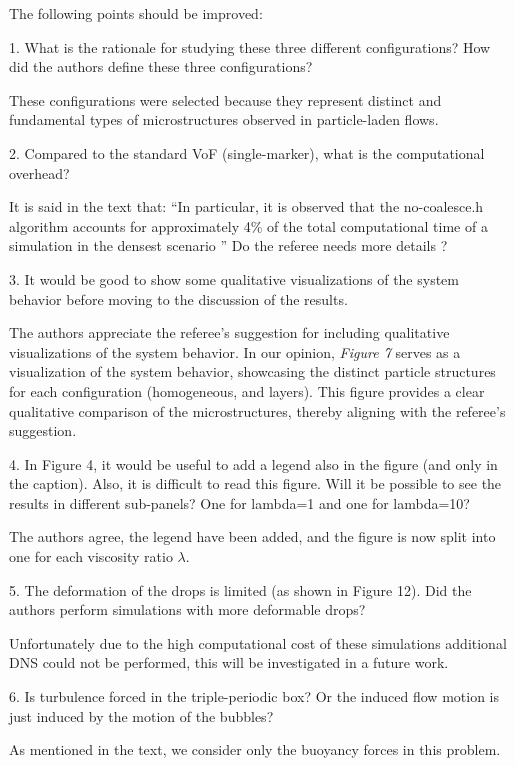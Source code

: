 \documentclass[10pt,a4paper]{article}
\newcommand{\tb}[1]{\color{blue}#1\color{black}}
\begin{document}
The following points should be improved:

1. What is the rationale for studying these three different configurations? How did the authors define these three configurations?

\tb{
    These configurations were selected because they represent distinct and fundamental types of microstructures observed in particle-laden flows. 
}

2. Compared to the standard VoF (single-marker), what is the computational overhead?

\tb{
    It is said in the text that:  
    ``In
    particular, it is observed that the no-coalesce.h algorithm accounts for approximately 4\% of the total
    computational time of a simulation in the densest scenario
    ''
    Do the referee needs more details ? 
}

3. It would be good to show some qualitative visualizations of the system behavior before moving to the discussion of the results.

\tb{
    The authors appreciate the referee's suggestion for including qualitative visualizations of the system behavior. 
    In our opinion, \textit{Figure 7} serves as a visualization of the system behavior, showcasing the distinct particle structures for each configuration (homogeneous, and layers). 
    This figure provides a clear qualitative comparison of the microstructures, thereby aligning with the referee's suggestion.
}

4. In Figure 4, it would be useful to add a legend also in the figure (and only in the caption). Also, it is difficult to read this figure. Will it be possible to see the results in different sub-panels? One for lambda=1 and one for lambda=10?

\tb{
    The authors agree, the legend have been added, and the figure is now split into one for each viscosity ratio $\lambda$. 
}

5. The deformation of the drops is limited (as shown in Figure 12). Did the authors perform simulations with more deformable drops? 

\tb{
    Unfortunately due to the high computational cost of these simulations additional DNS could not be performed, this will be investigated in a future work. 
}

6. Is turbulence forced in the triple-periodic box? Or the induced flow motion is just induced by the motion of the bubbles?

\tb{
    As mentioned in the text, we consider only the buoyancy forces in this problem. 
}
\end{document}
